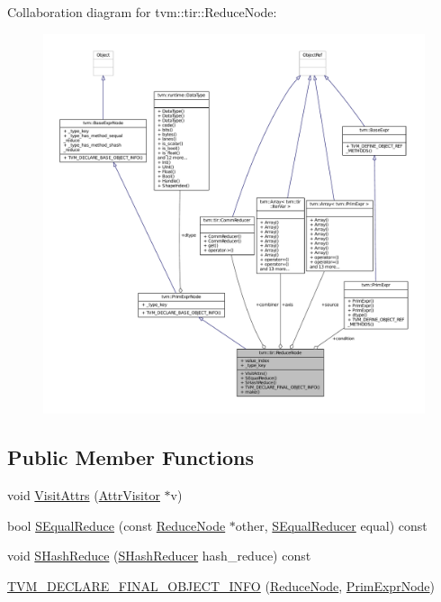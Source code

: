Collaboration diagram for tvm\+:\+:tir\+:\+:Reduce\+Node\+:
\nopagebreak
\begin{figure}[H]
\begin{center}
\leavevmode
\includegraphics[width=350pt]{classtvm_1_1tir_1_1ReduceNode__coll__graph}
\end{center}
\end{figure}
\subsection*{Public Member Functions}
\begin{DoxyCompactItemize}
\item 
void \hyperlink{classtvm_1_1tir_1_1ReduceNode_a9afa77e5fe462dd6d75740fb2b504dfa}{Visit\+Attrs} (\hyperlink{classtvm_1_1AttrVisitor}{Attr\+Visitor} $\ast$v)
\item 
bool \hyperlink{classtvm_1_1tir_1_1ReduceNode_ab8d18e8f464db03aa61dd3856952af34}{S\+Equal\+Reduce} (const \hyperlink{classtvm_1_1tir_1_1ReduceNode}{Reduce\+Node} $\ast$other, \hyperlink{classtvm_1_1SEqualReducer}{S\+Equal\+Reducer} equal) const 
\item 
void \hyperlink{classtvm_1_1tir_1_1ReduceNode_ac4a2c0897d979f63f48425846c2395d9}{S\+Hash\+Reduce} (\hyperlink{classtvm_1_1SHashReducer}{S\+Hash\+Reducer} hash\+\_\+reduce) const 
\item 
\hyperlink{classtvm_1_1tir_1_1ReduceNode_a54c6fc6eee8d5b29769c4c0adb7b0704}{T\+V\+M\+\_\+\+D\+E\+C\+L\+A\+R\+E\+\_\+\+F\+I\+N\+A\+L\+\_\+\+O\+B\+J\+E\+C\+T\+\_\+\+I\+N\+FO} (\hyperlink{classtvm_1_1tir_1_1ReduceNode}{Reduce\+Node}, \hyperlink{classtvm_1_1PrimExprNode}{Prim\+Expr\+Node})
\end{DoxyCompactItemize}
